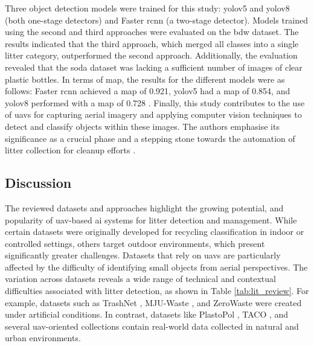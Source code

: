 Three object detection models were trained for this study: \gls{yolo}v5 and \gls{yolo}v8 (both one-stage detectors) and Faster \gls{rcnn} (a two-stage detector). Models trained using the second and third approaches were evaluated on the \gls{bdw} dataset. The results indicated that the third approach, which merged all classes into a single litter category, outperformed the second approach. Additionally, the evaluation revealed that the \gls{soda} dataset was lacking a sufficient number of images of clear plastic bottles. 
In terms of \gls{map}, the results for the different models were as follows: Faster \gls{rcnn} achieved a \gls{map} of 0.921, \gls{yolo}v5 had a \gls{map} of 0.854, and \gls{yolo}v8 performed with a \gls{map} of 0.728 \cite{soda_dataset, detect_litter}. 
Finally, this study contributes to the use of \gls{uav}s for capturing aerial imagery and applying computer vision techniques to detect and classify objects within these images. The authors emphasise its significance as a crucial phase and a stepping stone towards the automation of litter collection for cleanup efforts \cite{detect_litter, soda_dataset, daniel_thesis}.

\subsection{Discussion}
\label{subsec:3_discussion}

The reviewed datasets and approaches highlight the growing potential, and popularity of \gls{uav}-based \gls{ai} systems for litter detection and management. While certain datasets were originally developed for recycling classification in indoor or controlled settings, others target outdoor environments, which present significantly greater challenges. Datasets that rely on \gls{uav}s are particularly affected by the difficulty of identifying small objects from aerial perspectives.
The variation across datasets reveals a wide range of technical and contextual difficulties associated with litter detection, as shown in Table \ref{tab:lit_review}. For example, datasets such as TrashNet \cite{trashnet}, MJU-Waste \cite{mju_waste}, and ZeroWaste \cite{zerowaste} were created under artificial conditions. In contrast, datasets like PlastoPol \cite{plastopol}, TACO \cite{taco2020}, and several \gls{uav}-oriented collections \cite{haida,soda_dataset,uavvaste,bdwdataset,beach_litter,superdock,umgeosurvey} contain real-world data collected in natural and urban environments.

